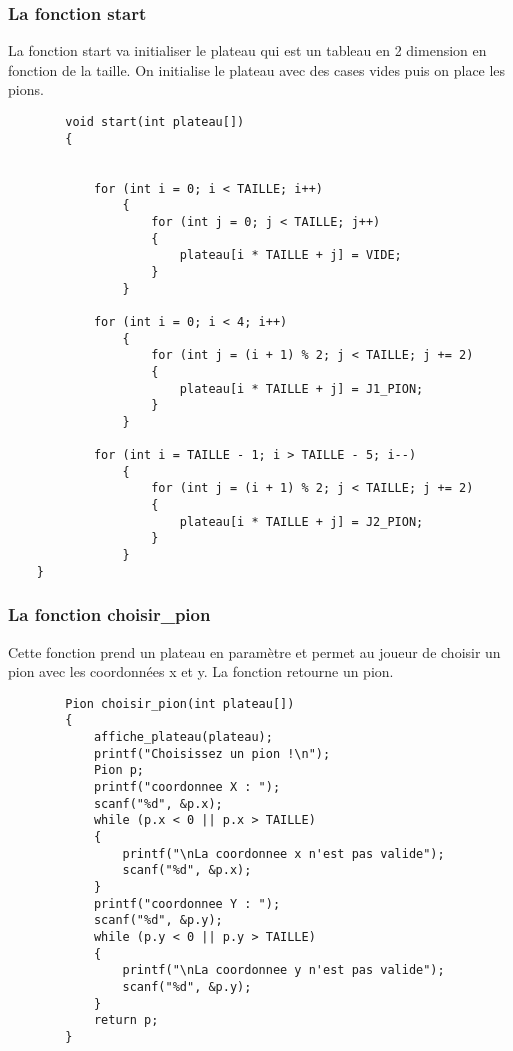 \documentclass{article}
\begin{document}
    \subsubsection{La fonction start}
        La fonction start va initialiser le plateau qui est un tableau en 2 dimension en fonction de la taille.
        On initialise le plateau avec des cases vides puis on place les pions. 
    \begin{lstlisting}
        void start(int plateau[])
        {

            
            for (int i = 0; i < TAILLE; i++)
                {
                    for (int j = 0; j < TAILLE; j++)
                    {
                        plateau[i * TAILLE + j] = VIDE;
                    }
                }

            for (int i = 0; i < 4; i++)
                {
                    for (int j = (i + 1) % 2; j < TAILLE; j += 2)
                    {
                        plateau[i * TAILLE + j] = J1_PION;
                    }
                }

            for (int i = TAILLE - 1; i > TAILLE - 5; i--)
                {
                    for (int j = (i + 1) % 2; j < TAILLE; j += 2)
                    {
                        plateau[i * TAILLE + j] = J2_PION;
                    }
                }
    }
    \end{lstlisting}
    \newpage
    \subsubsection{La fonction choisir\_pion}
    Cette fonction prend un plateau en paramètre et permet au joueur de choisir un pion avec les coordonnées x et y.
    La fonction retourne un pion.
    \begin{lstlisting}
        Pion choisir_pion(int plateau[])
        {
            affiche_plateau(plateau);
            printf("Choisissez un pion !\n");
            Pion p;
            printf("coordonnee X : ");
            scanf("%d", &p.x);
            while (p.x < 0 || p.x > TAILLE)
            {
                printf("\nLa coordonnee x n'est pas valide");
                scanf("%d", &p.x);
            }
            printf("coordonnee Y : ");
            scanf("%d", &p.y);
            while (p.y < 0 || p.y > TAILLE)
            {
                printf("\nLa coordonnee y n'est pas valide");
                scanf("%d", &p.y);
            }
            return p;
        }
    \end{lstlisting}
    \newpage
\end{document}
